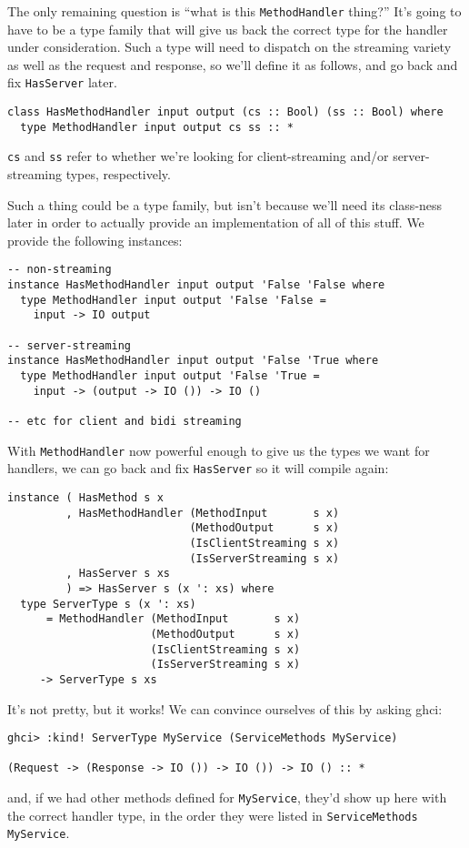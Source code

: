 The only remaining question is ``what is this \texttt{MethodHandler} thing?'' It's going to have to be a type family that will give us back the correct type for the handler under consideration. Such a type will need to dispatch on the streaming variety as well as the request and response, so we'll define it as follows, and go back and fix \texttt{HasServer} later.

\begin{verbatim}
class HasMethodHandler input output (cs :: Bool) (ss :: Bool) where
  type MethodHandler input output cs ss :: *
\end{verbatim}
\texttt{cs} and \texttt{ss} refer to whether we're looking for client-streaming and/or server-streaming types, respectively.

Such a thing could be a type family, but isn't because we'll need its class-ness later in order to actually provide an implementation of all of this stuff. We provide the following instances:

\begin{verbatim}
-- non-streaming
instance HasMethodHandler input output 'False 'False where
  type MethodHandler input output 'False 'False =
    input -> IO output

-- server-streaming
instance HasMethodHandler input output 'False 'True where
  type MethodHandler input output 'False 'True =
    input -> (output -> IO ()) -> IO ()

-- etc for client and bidi streaming
\end{verbatim}
With \texttt{MethodHandler} now powerful enough to give us the types we want for handlers, we can go back and fix \texttt{HasServer} so it will compile again:

\begin{verbatim}
instance ( HasMethod s x
         , HasMethodHandler (MethodInput       s x)
                            (MethodOutput      s x)
                            (IsClientStreaming s x)
                            (IsServerStreaming s x)
         , HasServer s xs
         ) => HasServer s (x ': xs) where
  type ServerType s (x ': xs)
      = MethodHandler (MethodInput       s x)
                      (MethodOutput      s x)
                      (IsClientStreaming s x)
                      (IsServerStreaming s x)
     -> ServerType s xs
\end{verbatim}
It's not pretty, but it works! We can convince ourselves of this by asking ghci:

\begin{verbatim}
ghci> :kind! ServerType MyService (ServiceMethods MyService)

(Request -> (Response -> IO ()) -> IO ()) -> IO () :: *
\end{verbatim}
and, if we had other methods defined for \texttt{MyService}, they'd show up here with the correct handler type, in the order they were listed in \texttt{ServiceMethods MyService}.

